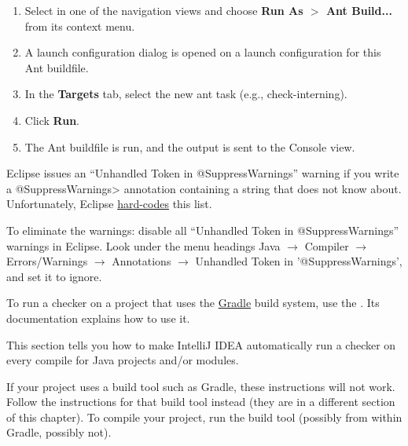 \begin{enumerate}

\item
  Select  in one of the navigation views and choose
  {\bf Run As $>$ Ant Build...} from its context menu.

\item
  A launch configuration dialog is opened on a launch configuration
  for this Ant buildfile.

\item
  In the {\bf Targets} tab, select the new ant task (e.g., check-interning).

\item
  Click {\bf Run}.

\item
  The Ant buildfile is run, and the output is sent to the Console view.

\end{enumerate}



Eclipse issues an ``Unhandled Token in @SuppressWarnings'' warning if you
write a \<@SuppressWarnings> annotation containing a string that does not
know about.  Unfortunately, Eclipse
\href{https://bugs.eclipse.org/bugs/show_bug.cgi?id=122475}{hard-codes}
this list.

To eliminate the warnings:
disable all ``Unhandled Token in @SuppressWarnings'' warnings in Eclipse.
Look under the menu headings Java $\rightarrow$ Compiler $\rightarrow$ Errors/Warnings $\rightarrow$ Annotations $\rightarrow$ Unhandled Token in '@SuppressWarnings', and set it to ignore.



To run a checker
on a project that uses the \href{https://gradle.org/}{Gradle} build system,
use the
.  Its documentation explains how to use it.




This section tells you how to make IntelliJ IDEA automatically run a
checker on every compile for Java projects and/or modules.

If your project uses a build tool such as Gradle, these instructions will
not work.  Follow the instructions for that build tool instead (they are in
a different section of this chapter).  To compile your project, run the
build tool (possibly from within Gradle, possibly not).

